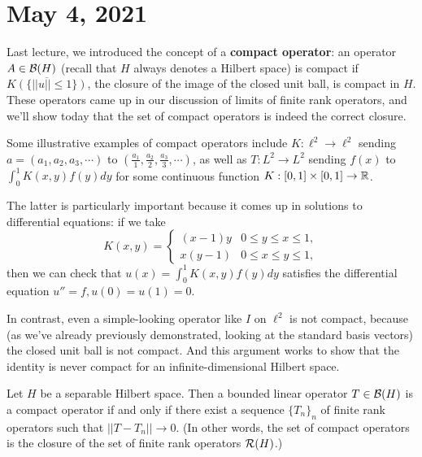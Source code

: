 \pagebreak\section{May 4, 2021}

Last lecture, we introduced the concept of a \textbf{compact operator}: an operator $A \in \mathcal{B}(H)$ (recall that $H$ always denotes a Hilbert space) is compact if $\overline{K(\{||u|| \le 1\})}$, the closure of the image of the closed unit ball, is compact in $H$. These operators came up in our discussion of limits of finite rank operators, and we'll show today that the set of compact operators is indeed the correct closure. 

\begin{example}
Some illustrative examples of compact operators include $K: \ell^2 \to \ell^2$ sending $a = (a_1, a_2, a_3, \cdots)$ to $(\frac{a_1}{1}, \frac{a_2}{2}, \frac{a_3}{3}, \cdots)$, as well as $T: L^2 \to L^2$ sending $f(x)$ to $\int_0^1 K(x, y) f(y) dy$ for some continuous function $K: [0, 1] \times [0, 1] \to \mathbb R$.
\end{example}

The latter is particularly important because it comes up in solutions to differential equations: if we take 
\[
    K(x, y) = \begin{cases} (x-1) y & 0 \le y \le x \le 1, \\ x(y-1) & 0 \le x \le y \le 1, \end{cases} 
\] 
then we can check that $u(x) = \int_0^1 K(x, y) f(y) dy$ satisfies the differential equation $u'' = f, u(0) = u(1) = 0$. 

\begin{example}
In contrast, even a simple-looking operator like $I$ on $\ell^2$ is not compact, because (as we've already previously demonstrated, looking at the standard basis vectors) the closed unit ball is not compact. And this argument works to show that the identity is never compact for an infinite-dimensional Hilbert space.
\end{example}

\begin{theorem}
Let $H$ be a separable Hilbert space. Then a bounded linear operator $T \in \mathcal{B}(H)$ is a compact operator if and only if there exist a sequence $\{T_n\}_n$ of finite rank operators such that $||T - T_n|| \to 0$. (In other words, the set of compact operators is the closure of the set of finite rank operators $\mathcal{R}(H)$.)
\end{theorem}


